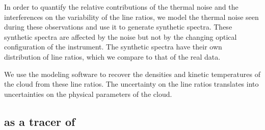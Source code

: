 In order to quantify the relative contributions of the thermal noise and the interferences on the variability of the line ratios, we model the thermal noise seen during these observations and use it to generate synthetic spectra.
These synthetic spectra are affected by the noise but not by the changing optical configuration of the instrument.
The synthetic spectra have their own distribution of line ratios, which we compare to that of the real data.

We use the \radex{} modeling software \parencite{vandertak2007radex}
to recover the densities and kinetic temperatures of the cloud from these line ratios.
The uncertainty on the line ratios translates into uncertainties on the physical parameters of the cloud.




\subsection{\texorpdfstring{ as a tracer of }{CO as a tracer of H2}}

